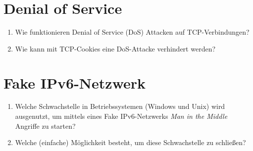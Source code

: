 \section*{Denial of Service}

\begin{enumerate}
\item Wie funktionieren Denial of Service (DoS) Attacken auf TCP-Verbindungen?
\item Wie kann mit TCP-Cookies eine DoS-Attacke verhindert werden?
\end{enumerate}

\section*{Fake IPv6-Netzwerk}

\begin{enumerate}
\item Welche Schwachstelle in Betriebssystemen (Windows und Unix) wird ausgenutzt, um mittels eines Fake IPv6-Netzwerks \textit{Man in the Middle} Angriffe zu starten?
\item Welche (einfache) Möglichkeit besteht, um diese Schwachstelle zu schließen?
\end{enumerate}
